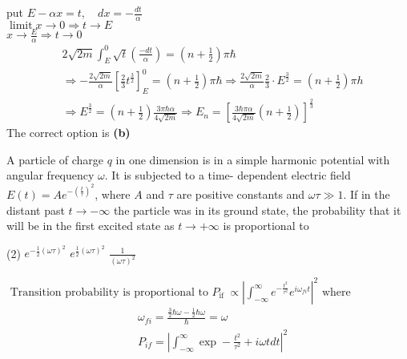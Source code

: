 \begin{enumerate}
\begin{answer}
	put $E-\alpha x=t, \quad d x=-\frac{d t}{\alpha}$\\
	$\operatorname{limit} x \rightarrow 0 \Rightarrow t \rightarrow E$\\
	$x \rightarrow \frac{E}{\alpha} \Rightarrow t \rightarrow 0$\\
	$$\begin{aligned}
	&2 \sqrt{2 m} \int_{E}^{0} \sqrt{t}\left(\frac{-d t}{\alpha}\right)=\left(n+\frac{1}{2}\right) \pi \hbar \\
	&\Rightarrow-\frac{2 \sqrt{2 m}}{\alpha}\left[\frac{2}{3} t^{\frac{3}{2}}\right]_{E}^{0}=\left(n+\frac{1}{2}\right) \pi \hbar \Rightarrow \frac{2 \sqrt{2 m}}{\alpha} \frac{2}{3} \cdot E^{\frac{3}{2}}=\left(n+\frac{1}{2}\right) \pi h \\
	&\Rightarrow E^{\frac{3}{2}}=\left(n+\frac{1}{2}\right) \frac{3 \pi \hbar \alpha}{4 \sqrt{2 m}} \Rightarrow E_{n}=\left[\frac{3 \hbar \pi \alpha}{4 \sqrt{2 m}}\left(n+\frac{1}{2}\right)\right]^{\frac{2}{3}}
	\end{aligned}$$
	The correct option is \textbf{(b)}
\end{answer}
\begin{minipage}{\textwidth}
	\item A particle of charge $q$ in one dimension is in a simple harmonic potential with angular frequency $\omega$. It is subjected to a time- dependent electric field $E(t)=A e^{-\left(\frac{t}{\tau}\right)^{2}}$, where $A$ and $\tau$ are positive constants and $\omega \tau \gg 1$. If in the distant past $t \rightarrow-\infty$ the particle was in its ground state, the probability that it will be in the first excited state as $t \rightarrow+\infty$ is proportional to
\end{minipage}
\begin{tasks}(2)
	\task[\textbf{A.}] $e^{-\frac{1}{2}(\omega \tau)^{2}}$
	\task[\textbf{B.}]$e^{\frac{1}{2}(\omega \tau)^{2}}$
	\task[\textbf{D.}]$\frac{1}{(\omega \tau)^{2}}$
\end{tasks}
\begin{answer}
	$\text { Transition probability is proportional to } P_{\text {if }} \propto\left|\int_{-\infty}^{\infty} e^{-\frac{t^{2}}{\tau^{2}}} e^{i \omega_{f i} t}\right|^{2} \text { where }$
	$$\begin{aligned}
	&\omega_{f i}=\frac{\frac{3}{2} \hbar \omega-\frac{1}{2} \hbar \omega}{\hbar}=\omega \\
	&P_{i f}=\left|\int_{-\infty}^{\infty} \exp -\frac{t^{2}}{\tau^{2}}+i \omega t d t\right|^{2}

\end{aligned}$$
\end{answer}
\end{enumerate}
